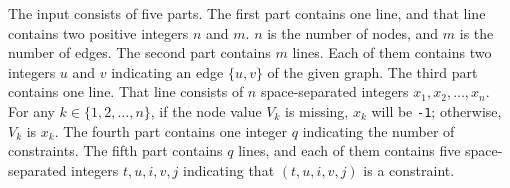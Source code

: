 The input consists of five parts.
The first part contains one line, and that line 
contains two positive integers $n$ and $m$. 
$n$ is the number of nodes, and $m$ is the number of edges.
The second part contains $m$ lines.
Each of them contains two integers $u$ and $v$ indicating an edge $\{u, v\}$
of the given graph.
The third part contains one line.
That line consists of $n$ space-separated integers $x_1,x_2,\dots,x_n$. 
For any $k\in\{1,2,\dots,n\}$, if the node value $V_k$ is missing, 
$x_k$ will be \verb+-1+; otherwise, $V_k$ is $x_k$.
The fourth part contains one integer $q$ indicating the number of constraints.
The fifth part contains $q$ lines, and each of them contains
five space-separated integers $t, u, i, v, j$ indicating that 
$(t, u, i, v, j)$ is a constraint.
